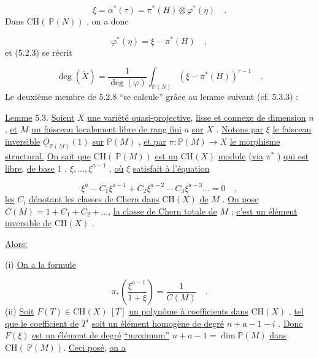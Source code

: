 \begin{equation}\tag{5.2.6$'$}
\xi = \alpha^*(\tau) = \pi^*(H) \otimes \varphi^*(\eta) \quad .
\end{equation}
Dans $\mathrm{CH}(\ \mathbb{P}(N))$ , on a donc

\begin{equation}\tag{5.2.7}
\varphi^*(\eta) = \xi - \pi^*(H) \quad ,
\end{equation}
et (5.2.3) se récrit

\begin{equation}\tag{5.2.8}
\deg(\check{X}) = \frac{1}{\deg(\varphi)} \int_{\mathbb{P}(N)} (\xi - \pi^*(H))^{r-1} \quad .
\end{equation}
Le deuxième membre de 5.2.8 ``se calcule'' grâce au lemme suivant (cf. 5.3.3) :

\underline{Lemme} 5.3. \underline{Soient} $X$ \underline{une variété quasi-projective}, \underline{lisse et connexe de dimension} $n$ , \underline{et} $M$ \underline{un faisceau  localement libre de rang fini} $a$ \underline{sur} $X$ . \underline{Notons par} $\xi$ \underline{le faisceau inversible} $\underline{O}_{\mathbb{P}(M)}(1)$ \underline{sur} $\mathbb{P}(M)$ ,
\underline{et par} $\pi : \mathbb{P}(M) \longrightarrow X$ \underline{le morphisme structural.} \underline{On sait que} $\mathrm{CH}(\ \mathbb{P}(M))$ \underline{est un} $\mathrm{CH}(X)$ \underline{module} (\underline{via} $\pi^*$ ) \underline{qui est libre,} \underline{de base} $1$ , $\xi, \ldots, \xi^{a-1}$ , \underline{où} $\xi$ \underline{satisfait à l'équation}

\begin{equation}\tag{5.3.1}
\xi^a - C_1\xi^{a-1} + C_2\xi^{a-2} - C_3\xi^{a-3} \ldots = 0 \quad ,
\end{equation}
\underline{les} $C_i$ \underline{dénotant les classes de Chern dans} $\mathrm{CH}(X)$ \underline{de} $M$ . \underline{On pose} $C(M) = 1+C_1+C_2+\ldots$, \underline{la classe de Chern totale de} $M$ ; \underline{c'est un élément inversible de} $\mathrm{CH}(X)$ .

\underline{Alors:}

(i) \underline{On a la formule}

\begin{equation}\tag{5.3.2}
\pi_*\!\left(\frac{\xi^{a-1}}{1 + \xi}\right) = \frac{1}{C(M)} \quad .
\end{equation}
(ii) \underline{Soit} $F(T) \in \mathrm{CH}(X)\ [T]$ \underline{un polynôme à coefficients dans} $\mathrm{CH}(X)$ , \underline{tel que le coefficient de} $T^i$ \underline{soit un élément homogène de degré} $n+a-1-i$ . \underline{Donc} $F(\xi)$ \underline{est un élément de degré} \underline{``maximum''} $n+a-1=\dim \mathbb{P}(M)$ \underline{dans} $\mathrm{CH}(\ \mathbb{P}(M))$. \underline{Ceci posé,} \underline{on a}

